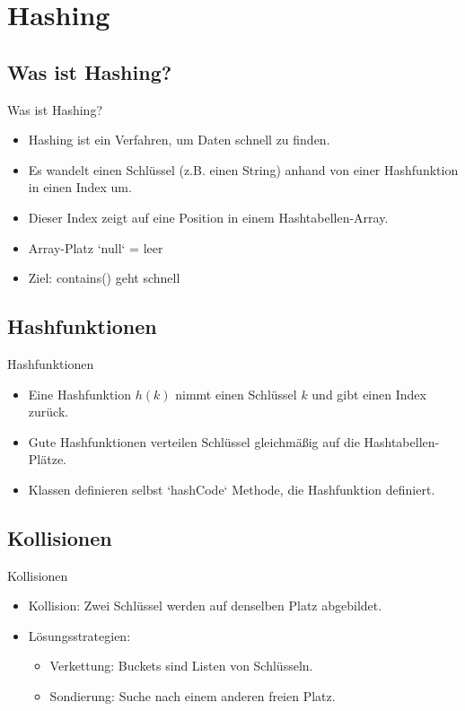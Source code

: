 \section{Hashing}

\subsection{Was ist Hashing?}
\begin{frame}{Was ist Hashing?}
  \begin{itemize}
    \item Hashing ist ein Verfahren, um Daten schnell zu finden.
    \item Es wandelt einen Schlüssel (z.B. einen String) anhand von einer Hashfunktion in einen Index um.
    \item Dieser Index zeigt auf eine Position in einem Hashtabellen-Array.
    \item Array-Platz `null` = leer 
    \item Ziel: contains() geht schnell
  \end{itemize}
\end{frame}

\subsection{Hashfunktionen}
\begin{frame}{Hashfunktionen}
  \begin{itemize}
    \item Eine Hashfunktion $h(k)$ nimmt einen Schlüssel $k$ und gibt einen Index zurück.
    \item Gute Hashfunktionen verteilen Schlüssel gleichmäßig auf die Hashtabellen-Plätze.
    \item Klassen definieren selbst `hashCode` Methode, die Hashfunktion definiert.
  \end{itemize}
\end{frame}

\subsection{Kollisionen}
\begin{frame}{Kollisionen}
  \begin{itemize}
    \item Kollision: Zwei Schlüssel werden auf denselben Platz abgebildet.
    \item Lösungsstrategien:
    \begin{itemize}
      \item Verkettung: Buckets sind Listen von Schlüsseln.
      \item Sondierung: Suche nach einem anderen freien Platz.
    \end{itemize}
  \end{itemize}
\end{frame}

